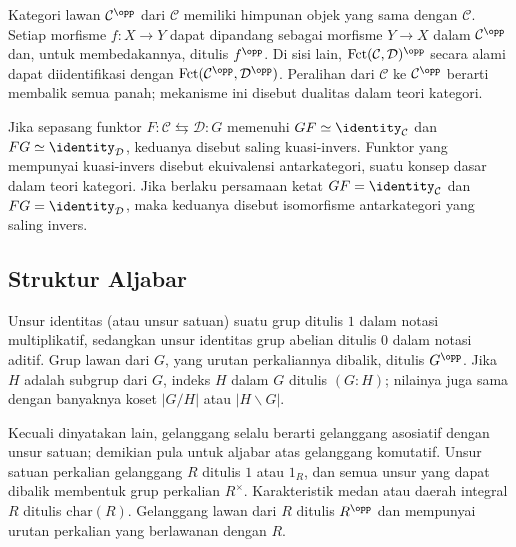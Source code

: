Kategori lawan $\mathcal{C}^{\opp}$ dari $\mathcal{C}$ memiliki himpunan objek
yang sama dengan $\mathcal{C}$. Setiap morfisme $f: X \to Y$ dapat dipandang
sebagai morfisme $Y \to X$ dalam $\mathcal{C}^{\opp}$ dan, untuk
membedakannya, ditulis $f^{\opp}$. Di sisi lain,
$\mathrm{Fct}(\mathcal{C}, \mathcal{D})^{\opp}$ secara alami dapat
diidentifikasi dengan
$\mathrm{Fct}(\mathcal{C}^{\opp}, \mathcal{D}^{\opp})$. Peralihan dari
$\mathcal{C}$ ke $\mathcal{C}^{\opp}$ berarti membalik semua panah; mekanisme
ini disebut dualitas dalam teori kategori.

Jika sepasang funktor $F: \mathcal{C} \leftrightarrows \mathcal{D}: G$
memenuhi $GF \simeq \identity_{\mathcal{C}}$ dan
$FG \simeq \identity_{\mathcal{D}}$, keduanya disebut saling kuasi-invers.
Funktor yang mempunyai kuasi-invers disebut ekuivalensi antarkategori, suatu
konsep dasar dalam teori kategori. Jika berlaku persamaan ketat
$GF = \identity_{\mathcal{C}}$ dan $FG = \identity_{\mathcal{D}}$, maka
keduanya disebut isomorfisme antarkategori yang saling invers.

\subsection*{Struktur Aljabar}

Unsur identitas (atau unsur satuan) suatu grup ditulis $1$ dalam notasi
multiplikatif, sedangkan unsur identitas grup abelian ditulis $0$ dalam notasi
aditif. Grup lawan dari $G$, yang urutan perkaliannya dibalik, ditulis
$G^{\opp}$. Jika $H$ adalah subgrup dari $G$, indeks $H$ dalam $G$ ditulis $(G:H)$;
nilainya juga sama dengan banyaknya koset $|G/H|$ atau $|H \backslash G|$.

Kecuali dinyatakan lain, gelanggang selalu berarti gelanggang asosiatif dengan
unsur satuan; demikian pula untuk aljabar atas gelanggang komutatif. Unsur
satuan perkalian gelanggang $R$ ditulis $1$ atau $1_R$, dan semua unsur
yang dapat dibalik membentuk grup perkalian $R^\times$. Karakteristik medan atau
daerah integral $R$ ditulis $\mathrm{char}(R)$. Gelanggang lawan dari $R$
ditulis $R^{\opp}$ dan mempunyai urutan perkalian yang berlawanan dengan $R$.

